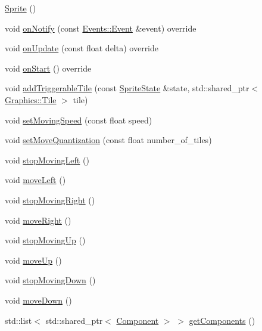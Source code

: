 \begin{DoxyCompactItemize}
\item 
\hyperlink{class_sprite_a12cba3ac1868418add3c4d95ce87e615}{Sprite} ()
\item 
void \hyperlink{class_sprite_a86d7cca33da7b1e2681da6bd094be088}{on\+Notify} (const \hyperlink{class_events_1_1_event}{Events\+::\+Event} \&event) override
\item 
void \hyperlink{class_sprite_a0db72afea03d07a957b1bee8a0828c2d}{on\+Update} (const float delta) override
\item 
void \hyperlink{class_sprite_afdefdcda4fb7de9ed10bb9571928f665}{on\+Start} () override
\item 
void \hyperlink{class_sprite_a974593031fb6e1a53883a588b7669422}{add\+Triggerable\+Tile} (const \hyperlink{sprite_8h_af7ccac6abcbe8bf213b36feaa7b69cda}{Sprite\+State} \&state, std\+::shared\+\_\+ptr$<$ \hyperlink{class_graphics_1_1_tile}{Graphics\+::\+Tile} $>$ tile)
\item 
void \hyperlink{class_sprite_a55be0cc7ccc4fb02d4e5c0c10cdd7c32}{set\+Moving\+Speed} (const float speed)
\item 
void \hyperlink{class_sprite_ae6dea1bbb49662ad95ad7fb4629bed54}{set\+Move\+Quantization} (const float number\+\_\+of\+\_\+tiles)
\item 
void \hyperlink{class_sprite_a02fea5f2c354539922212722aaa52dde}{stop\+Moving\+Left} ()
\item 
void \hyperlink{class_sprite_a2b32d9f2d5dad0992069fc0e41f18548}{move\+Left} ()
\item 
void \hyperlink{class_sprite_a6e003778e1db53846a484b0ce44fc1fe}{stop\+Moving\+Right} ()
\item 
void \hyperlink{class_sprite_a7de624519b1f7e754a4d26ba9fad2e6b}{move\+Right} ()
\item 
void \hyperlink{class_sprite_a03ac7597c67a532e3ba6f101670b55bd}{stop\+Moving\+Up} ()
\item 
void \hyperlink{class_sprite_ae8bd81da374569643dca0f473d6edb60}{move\+Up} ()
\item 
void \hyperlink{class_sprite_a029ed51250b9bfbe69e3de60fe533b5c}{stop\+Moving\+Down} ()
\item 
void \hyperlink{class_sprite_a558d8e35835a4a0c2ef6afdc7adc7309}{move\+Down} ()
\item 
std\+::list$<$ std\+::shared\+\_\+ptr$<$ \hyperlink{class_component}{Component} $>$ $>$ \hyperlink{class_sprite_a3d3ec9294747ab657db1ad2e6d0a15a5}{get\+Components} ()
\end{DoxyCompactItemize}
